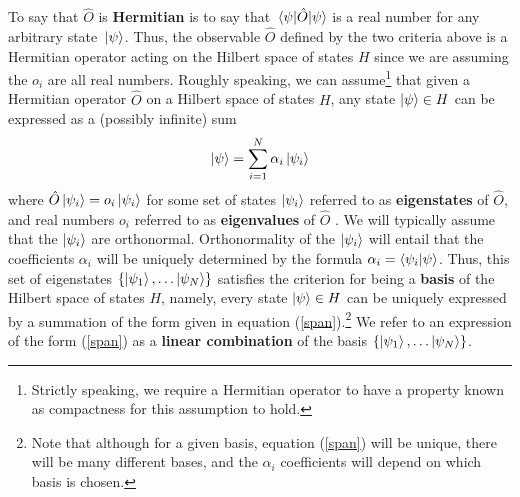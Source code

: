 To say that $\hat{O}$ is \textbf{Hermitian} is to say that $\ev*{\hat{O}}{\psi}$ is a real number for any arbitrary state $\ket*{\psi}$. Thus, the observable $\hat{O}$ defined by the two criteria above is a Hermitian operator acting on the Hilbert space of states $H$ since we are assuming the $o_i$ are all real numbers. Roughly speaking, we can assume\footnote{Strictly speaking, we require a Hermitian operator to have a property known as compactness for this assumption to hold.}  that given a Hermitian operator $\hat{O}$ on a Hilbert space of states $H$, any state $\ket{\psi}\in H$ can be expressed as a (possibly infinite) sum 
\begin{equation}\label{span}
\ket{\psi}=\sum_{i=1}^N\alpha_i\ket{\psi_i}
\end{equation}
where $\hat{O}\ket{\psi_i}=o_i\ket{\psi_i}$ for some set of states $\ket{\psi_i}$ referred to as \textbf{eigenstates} of $\hat{O}$, and real numbers $o_i$ referred to as \textbf{eigenvalues} of $\hat{O}$ . We will typically assume that the $\ket{\psi_i}$ are orthonormal. Orthonormality of the $\ket{\psi_i}$ will entail that the coefficients $\alpha_i$ will be uniquely determined by the formula $\alpha_i=\ip{\psi_i}{\psi}$. Thus, this set of eigenstates $\{\ket{\psi_1},\ldots\ket{\psi_N}\}$ satisfies the criterion for being a \textbf{basis} of the Hilbert space of states $H$, namely, every state $\ket{\psi}\in H$ can be uniquely expressed by a summation of the form given in equation (\ref{span}).\footnote{Note that although for a given basis, equation (\ref{span}) will be unique, there will be many different bases, and the $\alpha_i$ coefficients will depend on which basis is chosen.} We refer to an expression of the form (\ref{span}) as a \textbf{linear combination} of the basis $\{\ket{\psi_1},\ldots\ket{\psi_N}\}$. 

